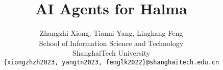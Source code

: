 \documentclass[letterpaper]{article}
\begin{document}
%
\title{AI Agents for Halma}
\author{Zhangzhi Xiong, Tianni Yang, Lingkang Feng\\
School of Information Science and Technology\\
ShanghaiTech University\\
{\tt\small \{xiongzhzh2023, yangtn2023, fenglk2022\}@shanghaitech.edu.cn}\\
}
\maketitle








\newpage
\end{document}
